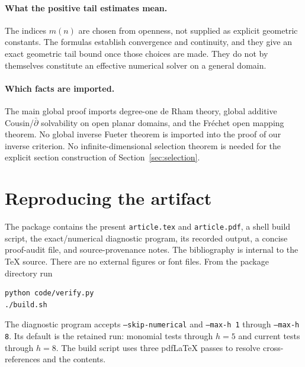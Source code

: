 \documentclass[11pt,a4paper]{article}
\numberwithin{equation}{section}
\theoremstyle{definition}
\theoremstyle{remark}
\begin{document}
\paragraph{What the positive tail estimates mean.}
The indices $m(n)$ are chosen from openness, not supplied as explicit geometric
constants. The formulas establish convergence and continuity, and they give
an exact geometric tail bound once those choices are made. They do not by
themselves constitute an effective numerical solver on a general domain.

\paragraph{Which facts are imported.}
The main global proof imports degree-one de Rham theory, global additive
Cousin/$\bar\partial$ solvability on open planar domains, and the Fr\'echet
open mapping theorem. No global inverse Fueter theorem is imported into the
proof of our inverse criterion. No infinite-dimensional selection theorem is
needed for the explicit section construction of Section~\ref{sec:selection}.

\section{Reproducing the artifact}

The package contains the present \texttt{article.tex} and \texttt{article.pdf},
a shell build script, the exact/numerical diagnostic program, its recorded
output, a concise proof-audit file, and source-provenance notes. The bibliography
is internal to the TeX source. There are no external figures or font files.
From the package directory run
\begin{verbatim}
python code/verify.py
./build.sh
\end{verbatim}
The diagnostic program accepts \texttt{--skip-numerical} and
\texttt{--max-h 1} through \texttt{--max-h 8}. Its default is the retained run:
monomial tests through $h=5$ and current tests through $h=8$. The build script
uses three pdfLaTeX passes to resolve cross-references and the contents.
\end{document}
